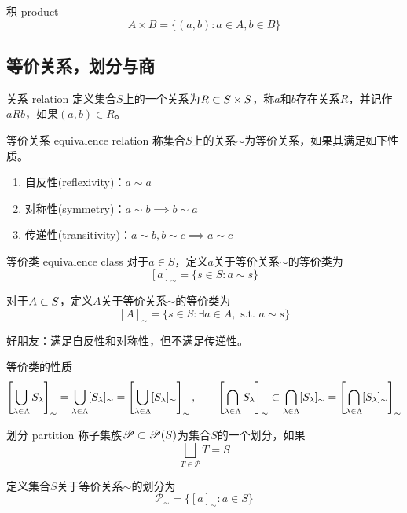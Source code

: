 \begin{definition}{积 product}
	$$
	A\times B=\{ (a,b):a\in A,b\in B \}
	$$
\end{definition}

\subsection{等价关系，划分与商}

\begin{definition}{关系 relation}
	定义集合$S$上的一个关系为$R\subset S\times S$，称$a$和$b$存在关系$R$，并记作$aRb$，如果$(a,b)\in R$。
\end{definition}

\begin{definition}{等价关系 equivalence relation}
	称集合$S$上的关系$\sim $为等价关系，如果其满足如下性质。
	\begin{enumerate}
		\item 自反性(reflexivity)：$a\sim a$
		\item 对称性(symmetry)：$a\sim b\implies b\sim a$
		\item 传递性(transitivity)：$a\sim b,b\sim c\implies a\sim c$
	\end{enumerate}
\end{definition}

\begin{definition}{等价类 equivalence class}
	对于$a\in S$，定义$a$关于等价关系$\sim$的等价类为
	$$
	[a]_\sim=\{ s\in S:a\sim s \}
	$$
	
	对于$A\subset S$，定义$A$关于等价关系$\sim$的等价类为
	$$
	[A]_\sim=\{ s\in S:\exists a\in A,\text{ s.t. }a\sim s \}
	$$
\end{definition}

\begin{example}
	好朋友：满足自反性和对称性，但不满足传递性。
\end{example}

\begin{proposition}{等价类的性质}
	$$
	\left[ \bigcup_{\lambda\in\Lambda}S_\lambda \right]_\sim
	=\bigcup_{\lambda\in\Lambda}[S_\lambda]_\sim=\left[ \bigcup_{\lambda\in\Lambda}[S_\lambda]_\sim \right]_\sim,\qquad
	\left[ \bigcap_{\lambda\in\Lambda}S_\lambda \right]_\sim
	\subset \bigcap_{\lambda\in\Lambda}[S_\lambda]_\sim=\left[ \bigcap_{\lambda\in\Lambda}[S_\lambda]_\sim \right]_\sim
	$$
\end{proposition}

\begin{definition}{划分 partition}
	称子集族$\mathscr{P}\subset\mathscr{P}(S)$为集合$S$的一个划分，如果
	$$
	\bigsqcup_{T\in\mathscr{P}}T=S
	$$
	
	定义集合$S$关于等价关系$\sim$的划分为
	$$
	\mathscr{P}_\sim=\{ [a]_\sim:a\in S \}
	$$
\end{definition}


